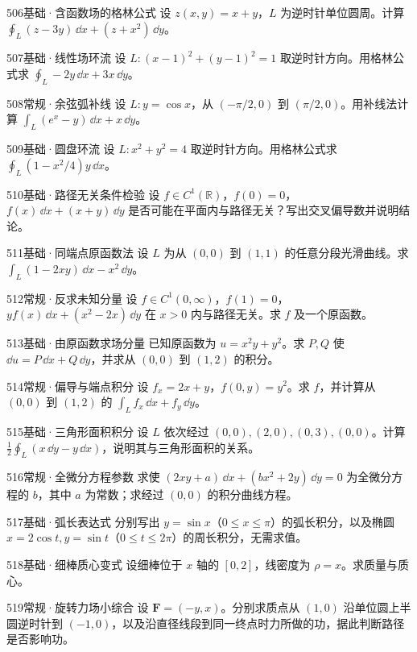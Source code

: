 \begin{exercise}{506}{基础·含函数场的格林公式}
设 $z(x,y)=x+y$，$L$ 为逆时针单位圆周。计算 $\oint_L(z-3y)\,\dd x+(z+x^2)\,\dd y$。
\end{exercise}
\begin{exercise}{507}{基础·线性场环流}
设 $L:(x-1)^2+(y-1)^2=1$ 取逆时针方向。用格林公式求 $\oint_L-2y\,\dd x+3x\,\dd y$。
\end{exercise}
\begin{exercise}{508}{常规·余弦弧补线}
设 $L:y=\cos x$，从 $(-\pi/2,0)$ 到 $(\pi/2,0)$。用补线法计算 $\int_L(e^x-y)\,\dd x+x\,\dd y$。
\end{exercise}
\begin{exercise}{509}{基础·圆盘环流}
设 $L:x^2+y^2=4$ 取逆时针方向。用格林公式求 $\oint_L(1-x^2/4)y\,\dd x$。
\end{exercise}
\begin{exercise}{510}{基础·路径无关条件检验}
设 $f\in C^1(\mathbb R)$，$f(0)=0$，$f(x)\,\dd x+(x+y)\,\dd y$ 是否可能在平面内与路径无关？写出交叉偏导数并说明结论。
\end{exercise}
\begin{exercise}{511}{基础·同端点原函数法}
设 $L$ 为从 $(0,0)$ 到 $(1,1)$ 的任意分段光滑曲线。求 $\int_L(1-2xy)\,\dd x-x^2\,\dd y$。
\end{exercise}
\begin{exercise}{512}{常规·反求未知分量}
设 $f\in C^1(0,\infty)$，$f(1)=0$，$yf(x)\,\dd x+(x^2-2x)\,\dd y$ 在 $x>0$ 内与路径无关。求 $f$ 及一个原函数。
\end{exercise}
\begin{exercise}{513}{基础·由原函数求场分量}
已知原函数为 $u=x^2y+y^2$。求 $P,Q$ 使 $\dd u=P\,\dd x+Q\,\dd y$，并求从 $(0,0)$ 到 $(1,2)$ 的积分。
\end{exercise}
\begin{exercise}{514}{常规·偏导与端点积分}
设 $f_x=2x+y$，$f(0,y)=y^2$。求 $f$，并计算从 $(0,0)$ 到 $(1,2)$ 的 $\int_Lf_x\,\dd x+f_y\,\dd y$。
\end{exercise}
\begin{exercise}{515}{基础·三角形面积积分}
设 $L$ 依次经过 $(0,0),(2,0),(0,3),(0,0)$。计算 $\frac12\oint_L(x\,\dd y-y\,\dd x)$，说明其与三角形面积的关系。
\end{exercise}
\begin{exercise}{516}{常规·全微分方程参数}
求使 $(2xy+a)\,\dd x+(bx^2+2y)\,\dd y=0$ 为全微分方程的 $b$，其中 $a$ 为常数；求经过 $(0,0)$ 的积分曲线方程。
\end{exercise}
\begin{exercise}{517}{基础·弧长表达式}
分别写出 $y=\sin x$（$0\leq x\leq\pi$）的弧长积分，以及椭圆 $x=2\cos t,y=\sin t$（$0\leq t\leq2\pi$）的周长积分，无需求值。
\end{exercise}
\begin{exercise}{518}{基础·细棒质心变式}
设细棒位于 $x$ 轴的 $[0,2]$，线密度为 $\rho=x$。求质量与质心。
\end{exercise}
\begin{exercise}{519}{常规·旋转力场小综合}
设 $\bm F=(-y,x)$。分别求质点从 $(1,0)$ 沿单位圆上半圆逆时针到 $(-1,0)$，以及沿直径线段到同一终点时力所做的功，据此判断路径是否影响功。
\end{exercise}
